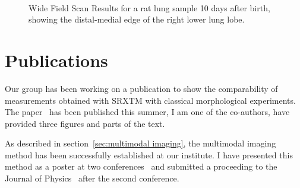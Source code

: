 \documentclass[]{scrartcl}
\begin{document}
\begin{figure}[p]
{%
			}\\
	\caption{Wide Field Scan Results for a rat lung sample 10 days after birth, showing the distal-medial edge of the right lower lung lobe.}
	\label{fig:wide field scan results}	
\end{figure}

\section{Publications}
\label{sec:publications}
Our group has been working on a publication to show the comparability of measurements obtained with SRXTM with classical morphological experiments. The paper~\cite{Tsuda2008} has been published this summer, I am one of the co-authors, have provided three figures and parts of the text.

As described in section~\ref{sec:multimodal imaging}, the multimodal imaging method has been successfully established at our institute. I have presented this method as a poster at two conferences~\cite{Haberthuer2008,Haberthuer2008b} and submitted a proceeding to the Journal of Physics~\cite{Haberthuer2009} after the second conference.
\end{document}
